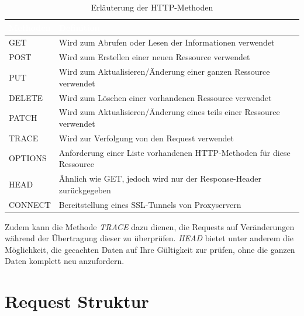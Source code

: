 \begin{table}[H]
\begin{center}
  \begin{tabular}{|  p{} |  p{} |}
  	\hline
  	\rowcolor{Gray}
  	\textcolor{white}{\textbf{Methoden}}			& \textcolor{white}{\textbf{Definition}} \\
    \hline
    GET		 									& Wird zum Abrufen oder Lesen der Informationen verwendet
    \\ \hline
    \rowcolor{LGray}
    POST									 		& Wird zum Erstellen einer neuen Ressource verwendet
    \\ \hline
    PUT									 		& Wird zum Aktualisieren/Änderung einer ganzen Ressource verwendet
    \\ \hline
    \rowcolor{LGray}
    DELETE								 		& Wird zum Löschen einer vorhandenen Ressource verwendet
    \\ \hline
    PATCH								 		& Wird zum Aktualisieren/Änderung eines teils einer Ressource verwendet
    \\ \hline
    \rowcolor{LGray}
    TRACE										& Wird zur Verfolgung von den Request verwendet
    \\ \hline
    OPTIONS								 		& Anforderung einer Liste vorhandenen HTTP-Methoden für diese Ressource
    \\ \hline
    \rowcolor{LGray}
    HEAD											& Ähnlich wie GET, jedoch wird nur der Response-Header zurückgegeben
    \\ \hline
    CONNECT										& Bereitstellung eines \ac{SSL}-Tunnels von Proxyservern %
    \\ \hline
  \end{tabular}
  \end{center}
\caption[HTTP-Methoden]{Erläuterung der HTTP-Methoden}
\label{tab:httpmethoden}
\end{table}

Zudem kann die Methode \textit{TRACE} dazu dienen, die Requests auf Veränderungen während der Übertragung dieser zu überprüfen. \textit{HEAD} bietet unter anderem die Möglichkeit, die gecachten Daten auf Ihre Gültigkeit zur prüfen, ohne die ganzen Daten komplett neu anzufordern\autocite[Vgl.][]{httpwiki}.

\section{Request Struktur}
\label{sec:reqstructure}

